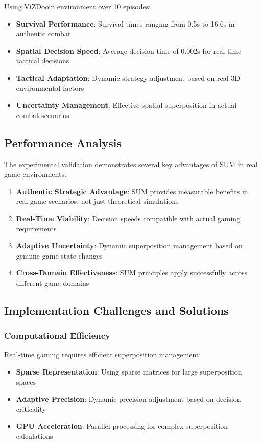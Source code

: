 \documentclass[11pt,a4paper]{article}
\begin{document}
Using ViZDoom environment over 10 episodes:

\begin{itemize}
\item \textbf{Survival Performance}: Survival times ranging from 0.5s to 16.6s in authentic combat
\item \textbf{Spatial Decision Speed}: Average decision time of 0.002s for real-time tactical decisions
\item \textbf{Tactical Adaptation}: Dynamic strategy adjustment based on real 3D environmental factors
\item \textbf{Uncertainty Management}: Effective spatial superposition in actual combat scenarios
\end{itemize}

\subsection{Performance Analysis}

The experimental validation demonstrates several key advantages of SUM in real game environments:

\begin{enumerate}
\item \textbf{Authentic Strategic Advantage}: SUM provides measurable benefits in real game scenarios, not just theoretical simulations
\item \textbf{Real-Time Viability}: Decision speeds compatible with actual gaming requirements
\item \textbf{Adaptive Uncertainty}: Dynamic superposition management based on genuine game state changes
\item \textbf{Cross-Domain Effectiveness}: SUM principles apply successfully across different game domains
\end{enumerate}

\subsection{Implementation Challenges and Solutions}

\subsubsection{Computational Efficiency}

Real-time gaming requires efficient superposition management:

\begin{itemize}
\item \textbf{Sparse Representation}: Using sparse matrices for large superposition spaces
\item \textbf{Adaptive Precision}: Dynamic precision adjustment based on decision criticality
\item \textbf{GPU Acceleration}: Parallel processing for complex superposition calculations
\end{itemize}
\end{document}
